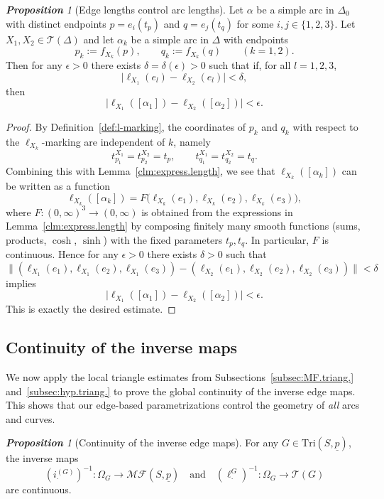 \documentclass[11pt, letterpaper]{amsart}
\theoremstyle{definition}
\theoremstyle{remark}
\newtheorem{proposition}[theorem]{\rm\bf Proposition}
\newcommand{\up}{\underline{p}}
\newcommand{\Sp}{(S,\up)}
\newcommand{\TSp}{\text{Tri}\Sp}
\newcommand{\iG}{i^{(G)}}
\newcommand{\cMFp}{\mathcal{MF} (S,\up)}
\newcommand{\cT}{\mathcal{T}}
\numberwithin{equation}{section}
\begin{document}
\begin{proposition}[Edge lengths control arc lengths]
\label{prop:edge.control.arc.hyp.triang.}
Let $\alpha$ be a simple arc in $\Delta_0$ with distinct endpoints $p=e_i(t_p)$ and $q=e_j(t_q)$ for some $i,j\in\{1,2,3\}$.
Let $X_1,X_2\in\cT(\Delta)$ and let $\alpha_k$ be a simple arc in $\Delta$ with endpoints
\[
p_k:=f_{X_k}(p),\qquad q_k:=f_{X_k}(q)\qquad (k=1,2).
\]
Then for any $\epsilon>0$ there exists $\delta=\delta(\epsilon)>0$ such that if, for all $l=1,2,3$, 
\[
\big|\ell_{X_1}(e_l)-\ell_{X_2}(e_l)\big|<\delta,
\]
then
\[
\big|\ell_{X_1}([\alpha_1])-\ell_{X_2}([\alpha_2])\big|<\epsilon.
\]
\end{proposition}

\begin{proof}
By Definition~\ref{def:l-marking}, the coordinates of $p_k$ and $q_k$ with respect to the $\ell_{X_k}$-marking are independent of $k$, namely
\[
t_{p_1}^{X_1}=t_{p_2}^{X_2}=t_p,\qquad
t_{q_1}^{X_1}=t_{q_2}^{X_2}=t_q.
\]
Combining this with Lemma~\ref{clm:express.length}, we see that $\ell_{X_k}([\alpha_k])$ can be written as a function
\[
\ell_{X_k}([\alpha_k])=F\big(\ell_{X_k}(e_1),\ell_{X_k}(e_2),\ell_{X_k}(e_3)\big),
\]
where $F:(0,\infty)^3\to(0,\infty)$ is obtained from the expressions in Lemma~\ref{clm:express.length} by composing finitely many smooth functions (sums, products, $\cosh$, $\sinh$) with the fixed parameters $t_p,t_q$.
In particular, $F$ is continuous.
Hence for any $\epsilon>0$ there exists $\delta>0$ such that
\[
\big\|(\ell_{X_1}(e_1),\ell_{X_1}(e_2),\ell_{X_1}(e_3))
-(\ell_{X_2}(e_1),\ell_{X_2}(e_2),\ell_{X_2}(e_3))\big\|<\delta
\]
implies
\[
\big|\ell_{X_1}([\alpha_1])-\ell_{X_2}([\alpha_2])\big|
<\epsilon.
\]
This is exactly the desired estimate.
\end{proof}



\subsection{Continuity of the inverse maps}
\label{subsec:invers.contin.}

We now apply the local triangle estimates from Subsections~\ref{subsec:MF.triang.} and~\ref{subsec:hyp.triang.} to prove the global continuity of the inverse edge maps.
This shows that our edge-based parametrizations control the geometry of \emph{all} arcs and curves.

\begin{proposition}[Continuity of the inverse edge maps]
\label{prop:MF.Teich.invers.continuous}
For any \(G\in\TSp\), the inverse maps
\[
(\iG_{\cdot})^{-1} : \Omega_G \longrightarrow \cMFp
\quad\text{and}\quad
(\ell^G_{\cdot})^{-1} : \Omega_G \longrightarrow \cT(G)
\]
are continuous.
\end{proposition}
\end{document}
